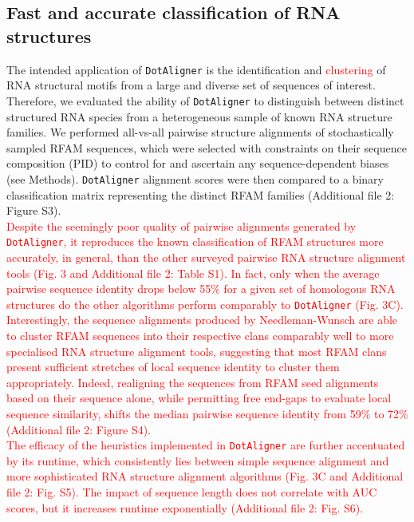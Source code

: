\documentclass{bmcart}
\newcommand\dotaligner{\texttt{DotAligner}}
\begin{document}
\subsection*{Fast and accurate classification of RNA structures} 

The intended application of \dotaligner{}  is the identification and
\textcolor{red}{clustering} of RNA structural motifs from a large and diverse set of sequences of interest. 
Therefore, we evaluated the ability of \dotaligner{} to distinguish between distinct structured 
RNA species from a heterogeneous sample of known RNA structure families. 
We performed all-vs-all pairwise structure alignments of stochastically sampled RFAM sequences, 
which were selected with constraints on their sequence composition (PID) to 
control for and ascertain any sequence-dependent biases (see Methods). 
\dotaligner{} alignment scores were then compared to a binary classification matrix 
representing the distinct RFAM families (Additional file 2: Figure S3).\\

\textcolor{red}{ Despite the seemingly poor quality of pairwise alignments generated by \dotaligner{}, it 
reproduces the known classification of RFAM structures more accurately, in general, than \textcolor{red}{the} other surveyed pairwise RNA structure alignment tools (Fig. 3 and Additional file 2: Table S1). In fact, only when the average pairwise sequence identity drops below 55\% for a given set of homologous RNA structures do the other algorithms perform comparably to \dotaligner{} (Fig. 3C). 
Interestingly, the sequence alignments produced by Needleman-Wunsch are able to cluster 
RFAM sequences into their respective clans comparably well to more specialised RNA structure
alignment tools, suggesting that most RFAM clans present sufficient stretches of local sequence identity 
to cluster them appropriately. Indeed, realigning the sequences from RFAM seed alignments based on their sequence alone, while permitting free end-gaps to evaluate local sequence similarity, 
shifts the median pairwise sequence identity from 59\% to 72\% (Additional file 2: Figure S4). }\\

\textcolor{red} {The efficacy of the heuristics implemented in \dotaligner{} are further accentuated by its runtime, which consistently lies between simple sequence alignment and more sophisticated 
RNA structure alignment algorithms (Fig. 3C and Additional file 2: Fig. S5). The impact of sequence length
does not correlate with AUC scores, but it increases runtime exponentially (Additional file 2: Fig. S6). 
}
\end{document}

